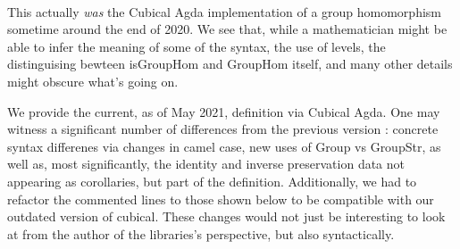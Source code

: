 \begin{code}
\AgdaSymbol{:}\AgdaSpace{}%
\AgdaSpace{}%
\AgdaSymbol{\{}\AgdaSymbol{\})}\AgdaSpace{}%
\AgdaSymbol{(}\AgdaSpace{}%
\AgdaSymbol{:}\AgdaSpace{}%
\AgdaSpace{}%
\AgdaSymbol{\{}\AgdaSymbol{\})}\AgdaSpace{}%
\AgdaSymbol{:}\AgdaSpace{}%
\AgdaSpace{}%
\AgdaSymbol{(}\AgdaSpace{}%
\AgdaSpace{}%
\AgdaSymbol{)}\AgdaSpace{}%
\<%
\\
\>[2][@{}l@{\AgdaIndent{0}}]%
\>[4]\AgdaSpace{}%
\<%
\\
%
\\[\AgdaEmptyExtraSkip]%
%
\>[4]\<%
\\
\>[4][@{}l@{\AgdaIndent{0}}]%
\>[6]\AgdaSpace{}%
\AgdaSymbol{:}\AgdaSpace{}%
\AgdaSpace{}%
\AgdaSpace{}%
\AgdaSpace{}%
\AgdaSpace{}%
\AgdaSpace{}%
\AgdaSpace{}%
\<%
\\
%
\>[6]\AgdaSpace{}%
\AgdaSymbol{:}\AgdaSpace{}%
\AgdaSpace{}%
\AgdaSpace{}%
\AgdaSpace{}%
\<%
\\
\>[0]\<%
\end{code}

This actually \emph{was} the Cubical Agda implementation of a group homomorphism
sometime around the end of 2020. We see that, while a mathematician might be
able to infer the meaning of some of the syntax, the use of levels, the
distinguising bewteen isGroupHom and GroupHom itself, and many other details
might obscure what's going on.

We provide the current, as of May 2021, definition via Cubical Agda. One may
witness a significant number of differences from the previous version :
concrete syntax differenes via changes in camel case, new uses of Group vs
GroupStr, as well as, most significantly, the identity and inverse preservation
data not appearing as corollaries, but part of the definition. Additionally, we
had to refactor the commented lines to those shown below to be compatible with
our outdated version of cubical.  These changes would not just be interesting
to look at from the author of the libraries's perspective, but also
syntactically.

